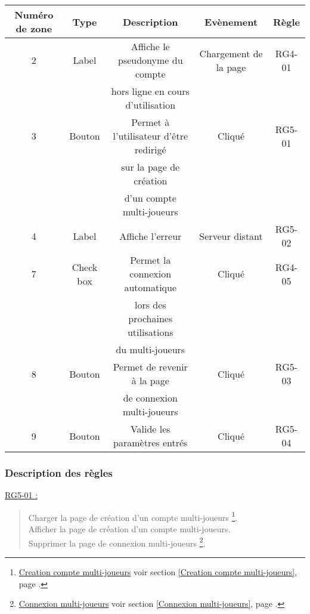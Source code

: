 \documentclass{report}
\begin{document}
			\begin{tabular}{|c|c|c|c|c|} \hline
				Numéro de zone & Type  & Description & Evènement &	Règle \\\hline
				2 & Label & Affiche le pseudonyme du compte & Chargement de la page & RG4-01 \\
				  &       & hors ligne en cours d'utilisation & & \\\hline
				3 & Bouton & Permet à l'utilisateur d'être redirigé & Cliqué & RG5-01\\
				  &        & sur la page de création  & & \\
				  &        & d'un compte multi-joueurs \footnotemark[1] & & \\\hline
				4 & Label & Affiche l'erreur & Serveur distant & RG5-02 \\\hline
				7 & Check box & Permet la connexion automatique & Cliqué & RG4-05 \\
				  &           & lors des prochaines utilisations&        & \\				
				  &           & du multi-joueurs                &        & \\\hline
				8 & Bouton & Permet de revenir à la page & Cliqué & RG5-03 \\
				  &        & de connexion multi-joueurs \footnotemark[2] & & \\\hline
				9 & Bouton & Valide les paramètres entrés & Cliqué & RG5-04 \\\hline
			\end{tabular}
			
		\subsubsection{Description des règles}

			\underline{RG5-01 :}
				\begin{quote}
					Charger la page de création d'un compte multi-joueurs%
						\footnote[1]{
							\hyperlink{Creation compte multi-joueurs}{Creation compte multi-joueurs}
							\og voir section \ref{Creation compte multi-joueurs}, page \pageref{Creation compte multi-joueurs}.\fg
						}.\\
					Afficher la page de création d'un compte multi-joueurs\footnotemark[1].\\
					Supprimer la page de connexion multi-joueurs%
						\footnote[2]{
							\hyperlink{Connexion multi-joueurs}{Connexion multi-joueurs}
							\og voir section \ref{Connexion multi-joueurs}, page \pageref{Connexion multi-joueurs}.\fg
						}.\\
				\end{quote}	
\end{document}

